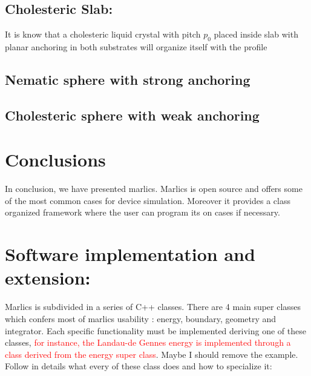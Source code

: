 \documentclass[final,5p,times,twocolumn]{elsarticle}
\begin{document}
\subsection{Cholesteric Slab:}

It is know that a cholesteric liquid crystal with pitch $p_0$ placed
inside slab with planar anchoring in both substrates will organize
itself with the profile 

\subsection{Nematic sphere with strong anchoring}


\subsection{Cholesteric sphere with weak anchoring}




\section{Conclusions}

In conclusion, we have presented marlics. Marlics is open source and
offers some of the most common cases for device simulation. Moreover
it provides a class organized framework where the user can program its
on cases if necessary.  

\label{sec:conclusions}

 \appendix

\section{Software implementation and extension:}\label{apx:extending_marlics}

Marlics is subdivided in a series of C++ classes. There are 4 main
super classes which confers most of marlics usability : energy,
boundary, geometry and integrator. Each specific functionality must be
implemented deriving one of these classes, \textcolor{red}{for
  instance, the Landau-de Gennes energy is implemented through a class
  derived from the energy super class}. Maybe I should remove the
example. Follow in details what every of these class does and how to specialize it:
\end{document}
